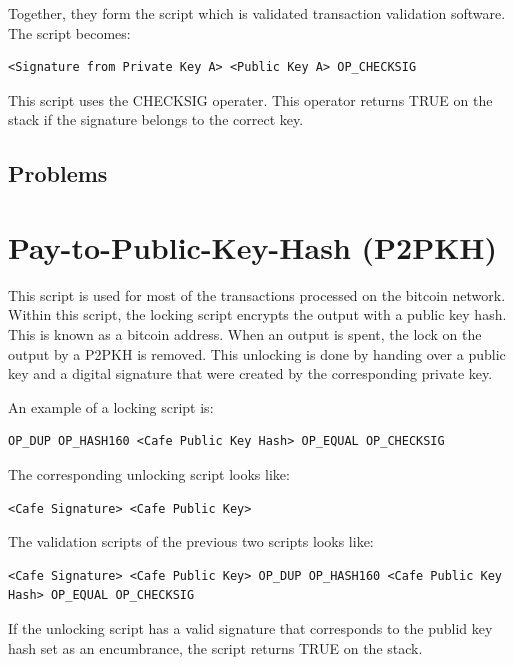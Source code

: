 \documentclass[a4paper, 12pt]{article}
\begin{document}
Together, they form the script which is validated transaction validation software. The script becomes:

\begin{lstlisting}[basicstyle=\ttfamily]
<Signature from Private Key A> <Public Key A> OP_CHECKSIG
\end{lstlisting}

This script uses the CHECKSIG operater. This operator returns TRUE on the stack if the signature belongs to the correct key.

\cite{book:1317587}

\subsection{Problems} %
\label{sub:problems}


\section{Pay-to-Public-Key-Hash (P2PKH)} %
\label{sec:pay_to_public_key_hash_p2pkh}

This script is used for most of the transactions processed on the bitcoin network. Within this script, the locking script encrypts the output with a public key hash. This is known as a bitcoin address. When an output is spent, the lock on the output by a P2PKH is removed. This unlocking is done by handing over a public key and a digital signature that were created by the corresponding private key.
\par
An example of a locking script is: 
\begin{lstlisting}[basicstyle=\ttfamily]
OP_DUP OP_HASH160 <Cafe Public Key Hash> OP_EQUAL OP_CHECKSIG
\end{lstlisting}

The corresponding unlocking script looks like:
\begin{lstlisting}[basicstyle=\ttfamily]
<Cafe Signature> <Cafe Public Key>
\end{lstlisting}

The validation scripts of the previous two scripts looks like:
\begin{lstlisting}[basicstyle=\ttfamily]
<Cafe Signature> <Cafe Public Key> OP_DUP OP_HASH160 <Cafe Public Key Hash> OP_EQUAL OP_CHECKSIG
\end{lstlisting}

If the unlocking script has a valid signature that corresponds to the publid key hash set as an encumbrance, the script returns TRUE on the stack. 




	
 
\end{document}
